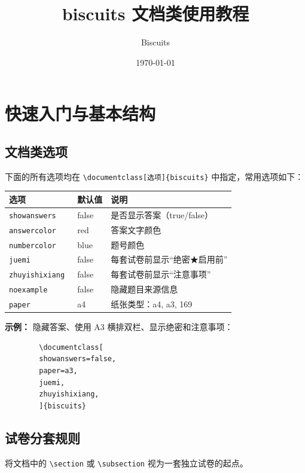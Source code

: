 \documentclass[
showanswers,        %
answercolor=red,    %
numbercolor=blue,   %
paper=a3,           %
nojuemi,              %
nozhuyishixiang,      %
example,        %
]{biscuits}
\begin{document}
	
	\title{\bfseries biscuits 文档类使用教程}
	\author{Biscuits}
	\date{\today}
	\maketitle
	\tableofcontents
\newpage
	\chapter{快速入门与基本结构}
\clearpage
	\section{文档类选项}
	
下面的所有选项均在 \verb|\documentclass[选项]{biscuits}| 中指定，常用选项如下：
	
	\begin{center}
		\begin{tabular}{lll}
			\toprule
			选项 & 默认值 & 说明 \\
			\midrule
			\tt showanswers & false & 是否显示答案（true/false） \\
			\tt answercolor & red  & 答案文字颜色 \\
			\tt numbercolor & blue & 题号颜色 \\
			\tt juemi       & false & 每套试卷前显示“绝密★启用前” \\
			\tt zhuyishixiang & false & 每套试卷前显示“注意事项” \\
			\tt noexample   & false & 隐藏题目来源信息 \\
			\tt paper       & a4   & 纸张类型：a4, a3, 169 \\
			\bottomrule
		\end{tabular}
	\end{center}
	
	\textbf{示例：} 隐藏答案、使用 A3 横排双栏、显示绝密和注意事项：
	\begin{verbatim}
		\documentclass[
		showanswers=false,
		paper=a3,
		juemi,
		zhuyishixiang,
		]{biscuits}
	\end{verbatim}
	
	\section{试卷分套规则}
	
   将文档中的 \verb|\section| 或 \verb|\subsection| 视为一套独立试卷的起点。
	
\end{document}

